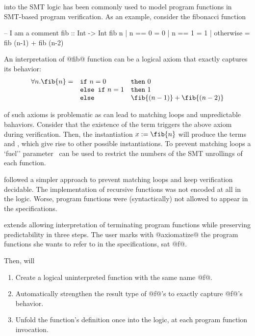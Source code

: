  into the SMT logic has been
commonly used to model program functions in SMT-based program
verification. As an example, consider the fibonacci function
%
\begin{code}
  -- I am a comment fib :: Int -> Int
  fib n
    | n == 0    = 0
    | n == 1    = 1
    | otherwise = fib (n-1) + fib (n-2)
\end{code}

An interpretation of @fib@ function can be a logical axiom that exactly captures its behavior:
$$
\begin{array}{rll}
\forall n. \fib{n} = &\texttt{if}\ n = 0 & \texttt{then}\ 0\\
& \texttt{else if}\ n = 1 & \texttt{then}\ 1\\
& \texttt{else}\ & \fib{(n-1)} + \fib{(n-2)}\\
\end{array}
$$

 of such axioms is problematic as can lead to
matching loops and unpredictable bahaviors.
%
Consider that the existence of the term 
triggers the above axiom during verification.
Then, the instantiation $x := \fib{n}$ will produce the terms
 and , which give rise to other possible instantiations.
%
To prevent matching loops a `fuel'' parameter~\citep{Amin2014ComputingWA}
can be used to restrict the numbers of the SMT
unrollings of each function.


\liquidHaskell followed a simpler approach to prevent matching loops
and keep verification decidable.
%
The implementation of recursive functions was not encoded at all in the logic.
%
Worse, program functions were (syntactically) not allowed
to appear in the specifications.

\libname extends \liquidHaskell allowing interpretation of terminating
program functions while preserving predictability in three steps.
%
The user marks with @axiomatize@
the program functions she wants to refer to in the specifications, sat @f@.

Then, \libname will
\begin{enumerate}
\item Create a logical uninterpreted function with the same name @f@.
\item Automatically strengthen the result type of @f@'s to exactly capture @f@'s behavior.
\item Unfold the function's definition once into the logic, at each program function invocation.
\end{enumerate}

